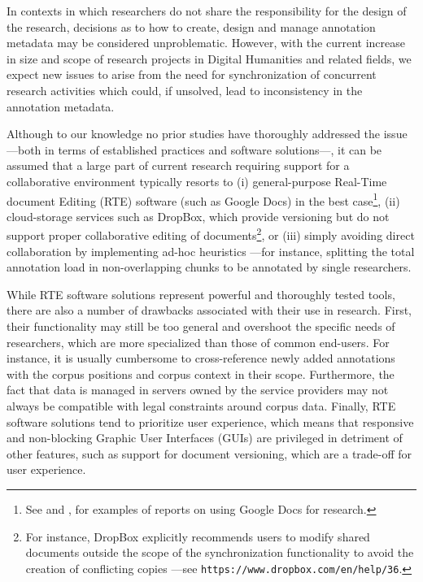 \documentclass{sig-alternate}
\begin{document}
In contexts in which researchers do not share the responsibility for the design of the research,
decisions as to how to create, design and manage annotation metadata may be considered unproblematic.
However, with the current increase in size and scope of research projects in Digital Humanities and
related fields, we expect new issues to arise from the need for synchronization of concurrent
research activities which could, if unsolved, lead to inconsistency in the annotation metadata.

Although to our knowledge no prior studies have thoroughly addressed the issue ---both in terms of
established practices and software solutions---,
it can be assumed that a large part of current research requiring support for a
collaborative environment typically resorts to (i) general-purpose Real-Time document Editing
(RTE) software (such as Google Docs) in the best case\footnote{
  See \cite{Rowlands2011} and \cite{Wood2011}, for examples of reports on using Google Docs
  for research.
}, (ii) cloud-storage services such as DropBox, which provide versioning but do
not support proper collaborative editing of documents\footnote{
  For instance, DropBox explicitly recommends users to modify shared documents outside the scope
  of the synchronization functionality to avoid the creation of conflicting copies ---see
  \texttt{https://www.dropbox.com/en/help/36}.
}, or (iii) simply avoiding direct collaboration by implementing ad-hoc heuristics ---for
instance, splitting the total annotation load in non-overlapping chunks to be annotated by
single researchers.

While RTE software solutions represent powerful and thoroughly tested tools, there are also
a number of drawbacks associated with their use in research.
First, their functionality may still be too general and overshoot the specific needs of
researchers, which are more specialized than those of common end-users. For instance, it is usually
cumbersome to cross-reference newly added annotations with the corpus positions and corpus
context in their scope.
Furthermore, the fact that data is managed in servers owned by the service providers may not
always be compatible with legal constraints around corpus data.
Finally, RTE software solutions tend to prioritize user experience, which means that
responsive and non-blocking Graphic User Interfaces (GUIs) are privileged in detriment of
other features, such as support for document versioning, which are a trade-off for
user experience.
\end{document}
